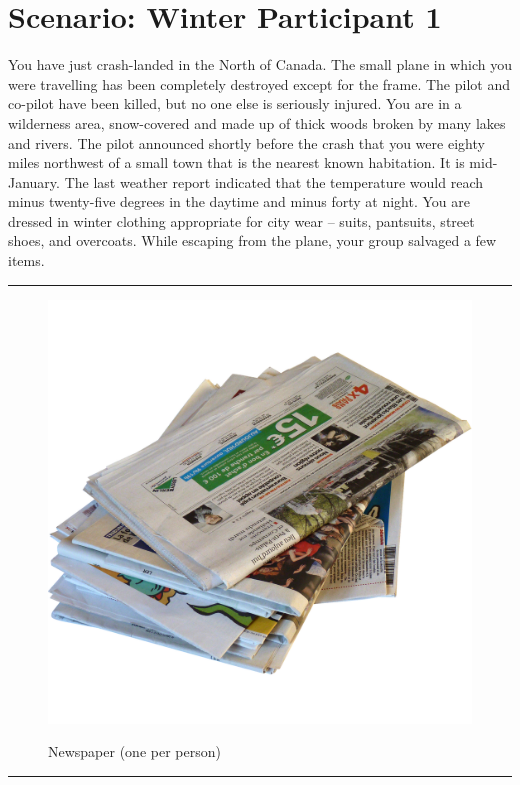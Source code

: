 \documentclass{article}
\begin{document}
    \clearpage
    \section*{Scenario: \textmd{Winter} \hfill Participant \textmd{1}}
    \Large You have just crash-landed in the North of Canada. The small plane in which you were travelling has been completely destroyed except for the frame. The pilot and co-pilot have been killed, but no one else is seriously injured.
You are in a wilderness area, snow-covered and made up of thick woods broken by many lakes and rivers. The pilot announced shortly before the crash that you were eighty miles northwest of a small town that is the nearest known habitation. It is mid-January. The last weather report indicated that the temperature would reach minus twenty-five degrees in the daytime and minus forty at night. You are dressed in winter clothing appropriate for city wear – suits, pantsuits, street shoes, and overcoats. While escaping from the plane, your group salvaged a few items.
\clearpage
        \par\noindent\rule{\textwidth}{0.4pt}
    \begin{figure}[H]
        \centering
        \begin{minipage}{0.25\textwidth}
            \centering
            \includegraphics[width=\textwidth]{../SurvivalItemImages/newspaper}
        \end{minipage}\hfill
        \begin{minipage}{0.7\textwidth}
            \centering
            \Large Newspaper (one per person)
        \end{minipage}
    \end{figure}
    \vspace{-0.8em}
    \noindent\rule{\textwidth}{0.4pt}
            
\end{document}
